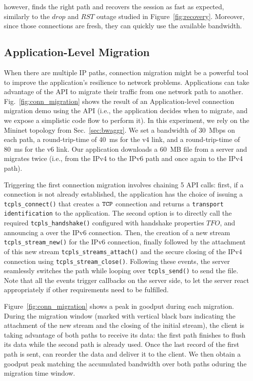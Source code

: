 \tcpls however, finds the right path and recovers the session as fast as
expected, similarly to the $drop$ and $RST$ outage studied in Figure~\ref{fig:recovery}.
Moreover, since those connections are fresh, they can quickly use the available bandwidth. 

\subsection{Application-Level Migration}

When there are multiple IP paths, connection migration might be a
powerful tool to improve the application's resilience to network problems. Applications
can take advantage of the \tcpls API to migrate their traffic from one network
path to another. 
Fig.~\ref{fig:conn_migration} shows the result of an Application-level
connection migration demo using the API (i.e., the application 
decides when to migrate, and we expose a simplistic code flow to perform it). 
In this experiment, we rely on the Mininet topology from Sec.~\ref{sec:bwaggr}.
We set a
bandwidth of 30~Mbps on each path, a round-trip-time of 40~ms for the v4 link,
and a round-trip-time of 80~ms for the v6 link. Our application downloads
a 60~MB file from a server and migrates twice (i.e., from the IPv4 to the IPv6 path
and once again to the IPv4 path).

Triggering the first connection migration involves chaining 5 API calls: first,
if a \tcp connection is not already established, the application has the choice 
of issuing a \texttt{tcpls\_connect()} that creates a $\texttt{TCP}$ connection and
returns a \texttt{transport identification} to the application. The second option
is to  directly call the required \texttt{tcpls\_handshake()} configured with handshake properties $TFO$,
and announcing a \join over the IPv6 connection. Then, the creation of a new stream
\texttt{tcpls\_stream\_new()} for the IPv6 connection, finally followed by the
attachment of this new stream \texttt{tcpls\_streams\_attach()} and the secure
closing of the IPv4 \tcp connection using \texttt{tcpls\_stream\_close()}.
Following these events, the server seamlessly switches the path while looping
over \texttt{tcpls\_send()} to send the file. Note that all the events
trigger callbacks on the server side, to let the server react appropriately if
other requirements need to be fulfilled.

Figure~\ref{fig:conn_migration} shows a peak in goodput during each
migration. During the migration window (marked with vertical black bars
indicating the attachment of the new stream and the closing of the initial
stream), the client is taking advantage of both paths to receive its data: the
first path finishes to flush its data while the second path is already used.
Once the last record of the first path is sent, \tcpls can reorder the
data and deliver it to the client. We then obtain a goodput peak matching the
accumulated bandwidth over both paths oduring the migration time window.

